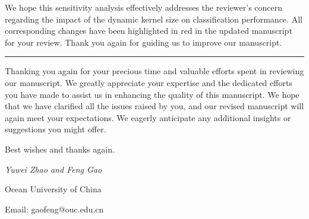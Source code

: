 We hope this sensitivity analysis effectively addresses the reviewer's concern regarding the impact of the dynamic kernel size on classification performance. All corresponding changes have been highlighted in red in the updated manuscript for your review. Thank you again for guiding us to improve our manuscript.


\vspace{2em}

\begin{center}
  \rule[-10pt]{14.3cm}{0.05em}
\end{center}

Thanking you again for your precious time and valuable efforts spent in reviewing our manuscript. We greatly appreciate your expertise and the dedicated efforts you have made to assist us in enhancing the quality of this manuscript. We hope that we have clarified all the issues raised by you, and our revised manuscript will again meet your expectations. We eagerly anticipate any additional insights or suggestions you might offer.

Best wishes and thanks again.

\textit{Yuwei Zhao and Feng Gao}

Ocean University of China

Email: gaofeng@ouc.edu.cn
